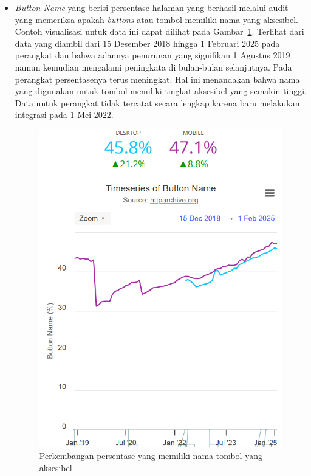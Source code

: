 \begin{itemize}
    \item \textit{Button Name} yang berisi persentase halaman yang berhasil melalui audit \light yang memeriksa apakah \textit{buttons} atau tombol memiliki nama yang aksesibel. Contoh visualisasi untuk data ini dapat dilihat pada Gambar~\ref{fig:buttonname}. Terlihat dari data yang diambil dari 15 Desember 2018 hingga 1 Februari 2025 pada perangkat \desktop dan \mobile bahwa adannya penurunan yang signifikan 1 Agustus 2019 namun kemudian mengalami peningkata di bulan-bulan selanjutnya. Pada perangkat \desktop persentasenya terus meningkat. Hal ini menandakan bahwa nama yang digunakan untuk tombol memiliki tingkat aksesibel yang semakin tinggi. Data untuk perangkat \desktop tidak tercatat secara lengkap karena \light baru melakukan integrasi pada 1 Mei 2022.
    \begin{figure}[H]
        \centering
        \includegraphics[width=0.4\linewidth]{Gambar/Contoh Button Name.png}
        \caption{Perkembangan persentase \web yang memiliki nama tombol yang aksesibel}
        \label{fig:buttonname}
    \end{figure}


\end{itemize}
